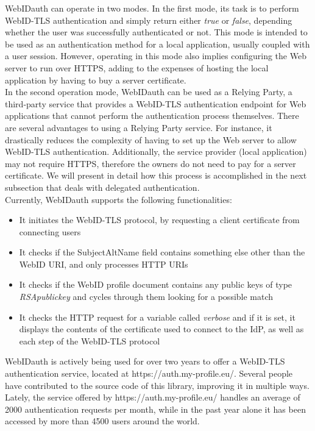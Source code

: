 WebIDauth can operate in two modes. In the first mode, its task is to perform WebID-TLS authentication and simply return either \textit{true} or \textit{false}, depending whether the user was successfully authenticated or not. This mode is intended to be used as an authentication method for a local application, usually coupled with a user session. However, operating in this mode also implies configuring the Web server to run over HTTPS, adding to the expenses of hosting the local application by having to buy a server certificate.\\

In the second operation mode, WebIDauth can be used as a Relying Party, a third-party service that provides a WebID-TLS authentication endpoint for Web applications that cannot perform the authentication process themselves. There are several advantages to using a Relying Party service. For instance, it drastically reduces the complexity of having to set up the Web server to allow WebID-TLS authentication. Additionally, the service provider (local application) may not require HTTPS, therefore the owners do not need to pay for a server certificate. We will present in detail how this process is accomplished in the next subsection that deals with delegated authentication.\\

Currently, WebIDauth supports the following functionalities:
\begin{itemize}
\item It initiates the WebID-TLS protocol, by requesting a client certificate from connecting users
\item It checks if the SubjectAltName field contains something else other than the WebID URI, and only processes HTTP URIs
\item It checks if the WebID profile document contains any public keys of type \textit{RSApublickey} and cycles through them looking for a possible match
\item It checks the HTTP request for a variable called \textit{verbose} and if it is set, it displays the contents of the certificate used to connect to the IdP, as well as each step of the WebID-TLS protocol
\end{itemize}

WebIDauth is actively being used for over two years to offer a WebID-TLS authentication service, located at https://auth.my-profile.eu/. Several people have contributed to the source code of this library, improving it in multiple ways. Lately, the service offered by https://auth.my-profile.eu/ handles an average of 2000 authentication requests per month, while in the past year alone it has been accessed by more than 4500 users around the world.


